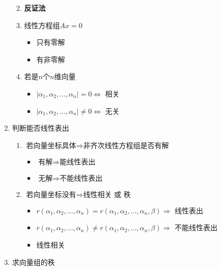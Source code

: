 \documentclass[a4paper,12pt]{article}
\begin{document}
\begin{enumerate}
\begin{enumerate}
\begin{enumerate}
\begin{itemize}
                \end{itemize}
            \end{enumerate}
            \item \textbf{反证法}
            \item 线性方程组$Ax = 0$
            \begin{itemize}
                \item 只有零解 \Leftrightarrow {}
                \item 有非零解 \Leftrightarrow {}
            \end{itemize}
            \item 若是$n$个$n$维向量
            \begin{itemize}
                \item $|\alpha_1, \alpha_2, \dots, \alpha_n| = 0 \Leftrightarrow$ 相关
                \item $|\alpha_1, \alpha_2, \dots, \alpha_n| \neq 0 \Leftrightarrow$ 无关
            \end{itemize}
        \end{enumerate}
        \item 判断能否线性表出
        \begin{enumerate}
            \item $\text{若向量坐标具体} \Rightarrow \text{非齐次线性方程组是否有解}$
            \begin{itemize}
                \item $\text{有解} \Rightarrow \text{能线性表出}$
                \item $\text{无解} \Rightarrow \text{不能线性表出}$
            \end{itemize}
            \item $\text{若向量坐标没有} \Rightarrow \text{线性相关 或 秩}$
            \begin{itemize}
                \item $r(\alpha_1, \alpha_2, \dots, \alpha_n) = r(\alpha_1, \alpha_2, \dots, \alpha_n, \beta) \Rightarrow$ 线性表出
                \item $r(\alpha_1, \alpha_2, \dots, \alpha_n) \neq r(\alpha_1, \alpha_2, \dots, \alpha_n, \beta) \Rightarrow$ 不能线性表出
                \item 线性相关
            \end{itemize}
        \end{enumerate}
        \item 求向量组的秩
        \begin{itemize}

\end{itemize}
\end{enumerate}
\end{document}

